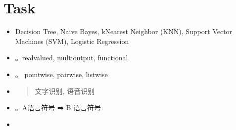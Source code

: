 \documentclass[letterpaper,10pt,english]{sphinxmanual}
\begin{document}
\section{Task}
\label{\detokenize{AI/main:task}}\begin{itemize}
\item {} \begin{description}
\sphinxAtStartPar
Decision Tree, Naive Bayes, k\sphinxhyphen{}Nearest Neighbor (KNN), Support Vector Machines (SVM), Logistic Regression

\end{description}

\item {} 
\sphinxAtStartPar
{} 。real\sphinxhyphen{}valued, multi\sphinxhyphen{}output, functional

\item {} 
\sphinxAtStartPar
{} 。 pointwise, pairwise, listwise

\item {} \begin{description}
\begin{quote}

\sphinxAtStartPar
文字识别, 语音识别
\end{quote}

\end{description}

\item {} 
\sphinxAtStartPar
{} 。A语言符号  ➡️ B 语言符号 

\item {} \begin{description}
\begin{quote}

\end{quote}


\end{description}
\end{itemize}
\end{document}
